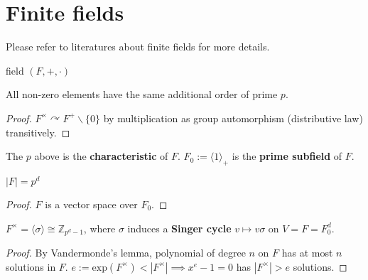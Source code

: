 \documentclass[a4paper,11pt]{article}
\def\maintitle#1{\section*{#1}}
\def\subtitle#1{\section{#1}}
\begin{document}
\else %
    \ifx\chaptitle\undefined %
        \def\maintitle#1{\subsection{#1}}
        \def\subtitle#1{\subsubsection{#1}}
    \else %
        \def\maintitle#1{\section{#1}}
        \def\subtitle#1{\subsection{#1}}
    \fi
\fi

\maintitle{Finite fields}

Please refer to literatures about finite fields for more details.

\begin{definition}
    field $(F,+,\cdot)$
\end{definition}

\begin{lemma}
    All non-zero elements have the same additional order of prime $p$.
\end{lemma}
\begin{proof}
    $F^\times\curvearrowright F^+\backslash\{0\}$ by multiplication as group automorphism (distributive law) transitively.
\end{proof}

\begin{definition}
    The $p$ above is the \textbf{characteristic} of $F$. $F_0:=\langle 1\rangle_+$ is the \textbf{prime subfield} of $F$.
\end{definition}

\begin{lemma}
    $|F|=p^d$
\end{lemma} 
\begin{proof}
    $F$ is a vector space over $F_0$.
\end{proof}

\begin{lemma}
    $F^\times=\langle \sigma\rangle\cong\mathbb{Z}_{p^d-1}$, where $\sigma$ induces  a \textbf{Singer cycle} $v\mapsto v\sigma$ on $V=F=F_0^d$.
\end{lemma}
\begin{proof}
    By Vandermonde's lemma, polynomial of degree $n$ on $F$ has at most $n$ solutions in $F$. $e:=\mathrm{exp}(F^\times)<|F^\times|\implies x^e-1=0$ has $|F^\times|>e$ solutions.
\end{proof}
\end{document}
